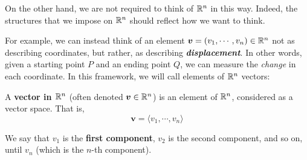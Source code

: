 On the other hand, we are not required to think of $\mathbb{R}^n$ in this way.  Indeed, the structures that we impose on $\mathbb{R}^n$ should reflect how we want to think.

For example, we can instead think of an element $\bm{v} = (v_1, \cdots, v_n) \in \mathbb{R}^n$ not as describing coordinates, but rather, as describing \textit{\textbf{displacement}}.  In other words, given a starting point $P$ and an ending point $Q$, we can measure the \textit{change} in each coordinate.  In this framework, we will call elements of $\mathbb{R}^n$ vectors:

\begin{definition}
A \textbf{vector in $\mathbb{R}^n$} (often denoted $\bm{v} \in \mathbb{R}^n$) is an element of $\mathbb{R}^n$, considered as a vector space.  That is,
$$\bm{v} = \langle v_1, \cdots, v_n \rangle$$

We say that $v_1$ is the \textbf{first component}, $v_2$ is the second component, and so on, until $v_n$ (which is the $n$-th component).
\end{definition}



